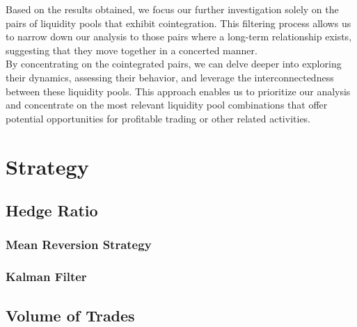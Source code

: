 \noindent Based on the results obtained, we focus our further investigation solely on the pairs of liquidity pools that exhibit cointegration. This filtering process allows us to narrow down our analysis to those pairs where a long-term relationship exists, suggesting that they move together in a concerted manner.
\\[5mm]
By concentrating on the cointegrated pairs, we can delve deeper into exploring their dynamics, assessing their behavior, and  leverage the interconnectedness between these liquidity pools. This approach enables us to prioritize our analysis and concentrate on the most relevant liquidity pool combinations that offer potential opportunities for profitable trading or other related activities.
 
\section{Strategy}

\subsection{Hedge Ratio}
\subsubsection{Mean Reversion Strategy}
\subsubsection{Kalman Filter}

\subsection{Volume of Trades}
